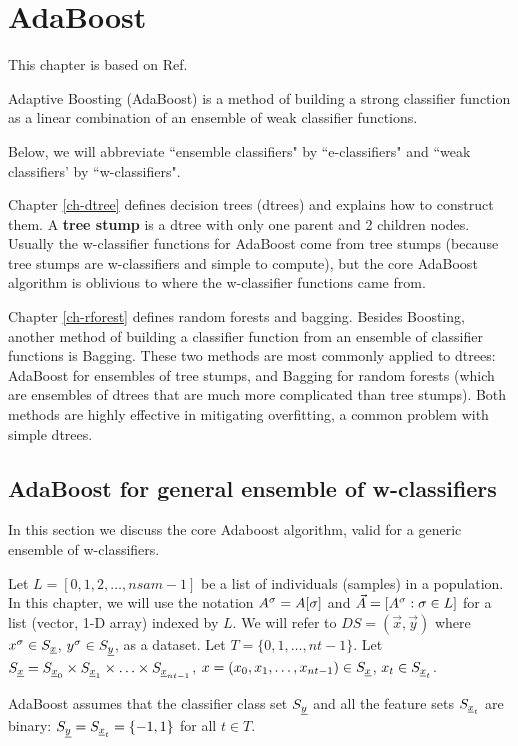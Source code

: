 \chapter{AdaBoost}
\label{ch-ada-boost}

This chapter
is based on Ref.\cite{wiki-adaboost}


Adaptive Boosting (AdaBoost) is 
a method of building
a strong
classifier function
as a linear 
combination
of an ensemble
of weak classifier
functions.

Below,
we will abbreviate
``ensemble classifiers" by ``e-classifiers"
and ``weak classifiers' by ``w-classifiers".


Chapter \ref{ch-dtree}
defines decision trees (dtrees)
and explains how to construct them.
A
{\bf tree stump}
is a dtree  with only one
parent and 2 children nodes.
Usually the 
w-classifier functions
for AdaBoost
come from tree stumps
(because tree stumps
are w-classifiers
and simple to compute), but
the core
AdaBoost algorithm
is oblivious to 
where the w-classifier functions came from.



Chapter \ref{ch-rforest}
defines random forests and bagging.
Besides Boosting,
another method
of building
a classifier function
from an ensemble 
of classifier functions is
Bagging.
These two methods are most commonly
applied to dtrees: AdaBoost for ensembles of
tree stumps, and Bagging for random 
forests (which
are ensembles
of dtrees that are much more
complicated than tree stumps). Both methods 
 are highly effective
in mitigating overfitting,
a common problem with simple
dtrees.

\section{AdaBoost for general ensemble
of w-classifiers}
In this 
section 
we discuss the core Adaboost
algorithm,
valid for a generic ensemble of w-classifiers.

Let $L=[0,1,2, \ldots, nsam-1]$ be a list of
individuals (samples) in a population.
In this chapter, we will use the notation 
$A^\sigma=A[\sigma]$ 
and $\vec{A}=[A^\sigma:\sigma\in L]$
for a  list (vector, 1-D  array) indexed by $L$.
We will refer to $DS=(\vec{x}, \vec{y})$ 
where $x^\sigma\in S_{\underline{x}}$, $y^\sigma\in S_{\underline{y}}$,
as a dataset. 
Let $T=\{0,1, \dots, nt-1\}$.
Let
$S_{\underline{x}}= S_{{\underline{x}}_0}\times S_{{\underline{x}}_1}
\times\ldots\times S_{{\underline{x}}_{nt-1}}$,
$x=(x_0, x_1, \ldots, x_{nt-1})\in S_{\underline{x}}$, 
$x_t\in S_{{\underline{x}}_t}$.

AdaBoost assumes
that the classifier class set
$S_{\underline{y}}$  and
all the feature sets $S_{{\underline{x}}_t}$ 
are
binary:
$S_{\underline{y}}=S_{{\underline{x}}_t}=\{-1, 1\}$ for 
all $t\in T$.


